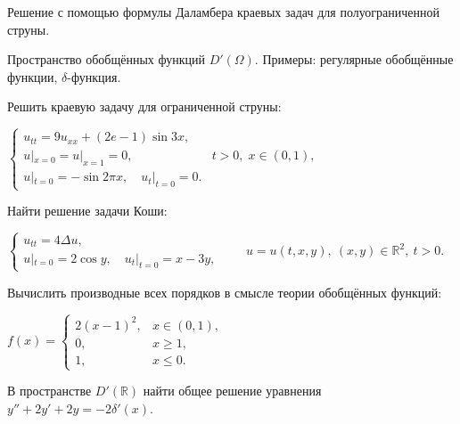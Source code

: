 
\begin{cond}
	Решение с помощью формулы Даламбера краевых задач для полуограниченной струны.
\end{cond}

\begin{cond}
	Пространство обобщённых функций $D'(\Omega)$. Примеры: регулярные обобщённые функции, $\delta$-функция.
\end{cond}

\begin{cond}
	Решить краевую задачу для ограниченной струны:

	\(
	\begin{cases}
		u_{tt} = 9u_{xx} + (2e - 1)\sin 3x,              \\
		u|_{x=0} = u|_{x=1} = 0, & t > 0,\; x \in (0,1), \\
		u|_{t=0} = -\sin 2\pi x,\quad u_t|_{t=0} = 0.
	\end{cases}
	\)
\end{cond}

\begin{cond}
	Найти решение задачи Коши:

	\(
	\begin{cases}
		u_{tt} = 4\Delta u, \\
		u|_{t=0} = 2\cos y,\quad u_t|_{t=0} = x - 3y,
	\end{cases}
	\qquad
	u = u(t,x,y),\ (x,y)\in\mathbb{R}^2,\ t>0.
	\)
\end{cond}

\begin{sol}

\end{sol}

\begin{out}

\end{out}

\begin{cond}
	Вычислить производные всех порядков в смысле теории обобщённых функций:

	\(
	f(x) =
	\begin{cases}
		2(x-1)^2, & x \in (0,1), \\
		0,        & x \ge 1,     \\
		1,        & x \le 0.
	\end{cases}
	\)
\end{cond}

\begin{cond}
	В пространстве \(D'(\mathbb{R})\) найти общее решение уравнения
	$y'' + 2y' + 2y = -2\delta'(x)$.
\end{cond}
